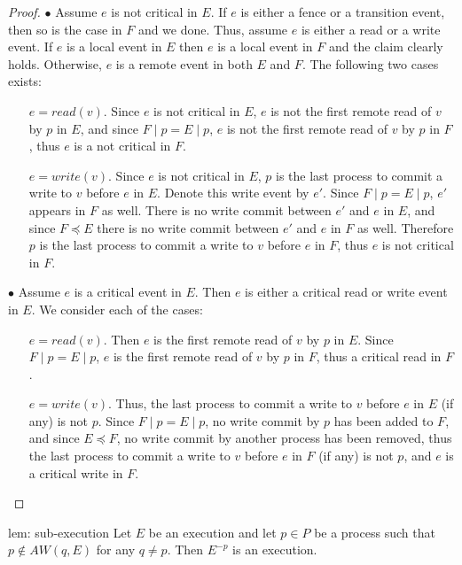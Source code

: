 \begin{proof} \mbox{}

	$\bullet$ Assume $e$ is not critical in $E$. If $e$ is either a fence or a transition event, then so is the case in $F$ and we done. Thus, assume $e$ is either a read or a write event. If $e$ is a local event in $E$ then $e$ is a local event in $F$ and the claim clearly holds. Otherwise, $e$ is a remote event in both $E$ and $F$. The following two cases exists:
	\begin{itemize}
	\item [$e = read(v)$.] Since $e$ is not critical in $E$, $e$ is not the first remote read of $v$ by $p$ in $E$, and since $F \mid p = E \mid p$, $e$ is not the first remote read of $v$ by $p$ in $F$, thus $e$ is a not critical in $F$.
	\item [$e = write(v)$.] Since $e$ is not critical in $E$, $p$ is the last process to commit a write to $v$ before $e$ in $E$. Denote this write event by $e'$. Since $F \mid p = E \mid p$, $e'$ appears in $F$ as well. There is no write commit between $e'$ and $e$ in $E$, and since $F \preceq E$ there is no write commit between $e'$ and $e$ in $F$ as well. Therefore $p$ is the last process to commit a write to $v$ before $e$ in $F$, thus $e$ is not critical in $F$.
	\end{itemize}
	
	$\bullet$ Assume $e$ is a critical event in $E$. Then $e$ is either a critical read or write event in $E$. We consider each of the cases:
	\begin{itemize}
	\item [$e = read(v)$.] Then $e$ is the first remote read of $v$ by $p$ in $E$. Since $F \mid p = E \mid p$, $e$ is the first remote read of $v$ by $p$ in $F$, thus a critical read in $F$.
	\item [$e = write(v)$.] Thus, the last process to commit a write to $v$ before $e$ in $E$ (if any) is not $p$. Since $F \mid p = E \mid p$, no write commit by $p$ has been added to $F$, and since $E \preceq F$, no write commit by another process has been removed, thus the last process to commit a write to $v$ before $e$ in $F$ (if any) is not $p$, and $e$ is a critical write in $F$.
	\end{itemize}
\end{proof}





\begin{lemma-repeat} {lem: sub-execution}
	Let $E$ be an execution and let $p \in P$ be a process such that $p \notin AW(q,E)$ for any $q \neq p$. Then $E^{-p}$ is an execution.
\end{lemma-repeat}

